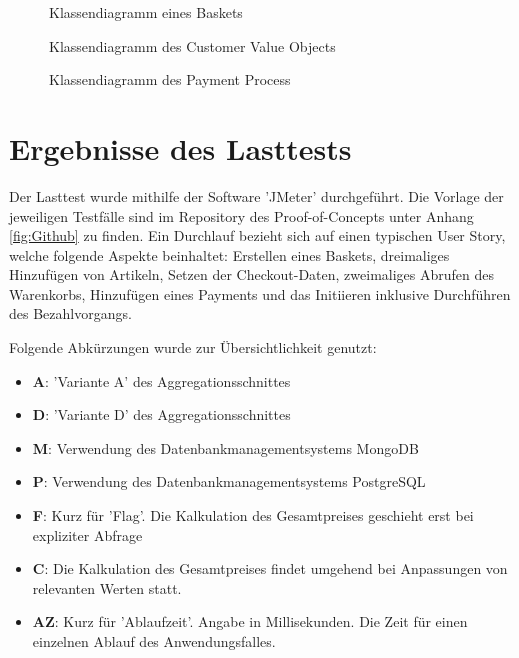 \begin{anhang}
\begin{figure}[htbp]
	\centering
	
	\caption{Klassendiagramm eines Baskets}
	\label{fig:VO-Basket}
\end{figure}

\begin{figure}[htbp]
	\centering
	
	\caption{Klassendiagramm des Customer Value Objects}
	\label{fig:VO-Customer}
\end{figure}

\begin{figure}[htbp]
	\centering
	
	\caption{Klassendiagramm des Payment Process}
	\label{fig:VO-Payment}
\end{figure}

\section{Ergebnisse des Lasttests} \label{label:Lasttests}

Der Lasttest wurde mithilfe der Software 'JMeter' durchgeführt. Die Vorlage der jeweiligen Testfälle sind im Repository des Proof-of-Concepts unter Anhang \ref{fig:Github} zu finden. Ein Durchlauf bezieht sich auf einen typischen User Story, welche folgende Aspekte beinhaltet: Erstellen eines Baskets, dreimaliges Hinzufügen von Artikeln, Setzen der Checkout-Daten, zweimaliges Abrufen des Warenkorbs, Hinzufügen eines Payments und das Initiieren inklusive Durchführen des Bezahlvorgangs. 

Folgende Abkürzungen wurde zur Übersichtlichkeit genutzt:
\begin{itemize}[noitemsep,nolistsep]
	\item \textbf{A}: 'Variante A' des Aggregationsschnittes
	\item \textbf{D}: 'Variante D' des Aggregationsschnittes
	\item \textbf{M}: Verwendung des Datenbankmanagementsystems MongoDB
	\item \textbf{P}: Verwendung des Datenbankmanagementsystems PostgreSQL
	\item \textbf{F}: Kurz für 'Flag'. Die Kalkulation des Gesamtpreises geschieht erst bei expliziter Abfrage
	\item \textbf{C}: Die Kalkulation des Gesamtpreises findet umgehend bei Anpassungen von relevanten Werten statt.
	\item \textbf{AZ}: Kurz für 'Ablaufzeit'. Angabe in Millisekunden. Die Zeit für einen einzelnen Ablauf des Anwendungsfalles. 
\end{itemize}



\end{anhang}
